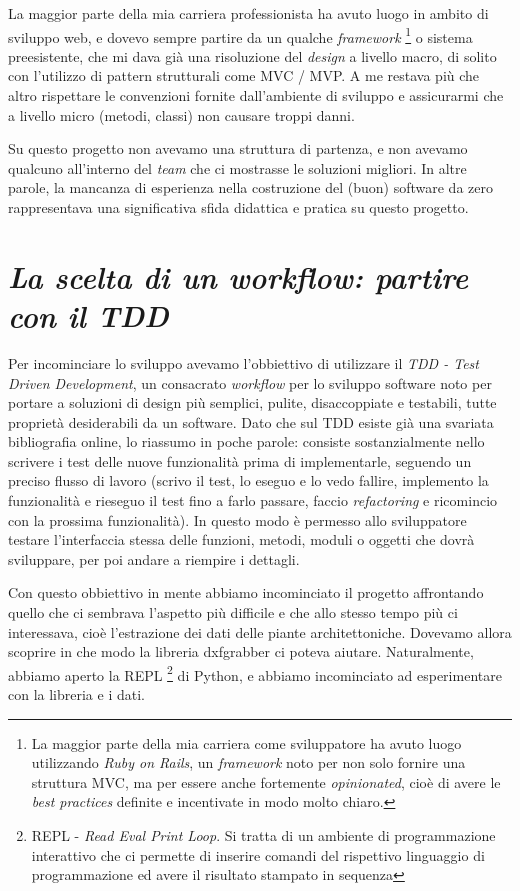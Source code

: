 \documentclass[12pt]{report}
\begin{document}
La maggior parte della mia carriera professionista ha avuto luogo in ambito di sviluppo web, e dovevo sempre partire da un qualche \textit{framework}
\footnote{La maggior parte della mia carriera come sviluppatore ha avuto luogo utilizzando \textit{Ruby on Rails}, un \textit{framework} noto per non solo fornire una struttura MVC, ma per essere anche fortemente \textit{opinionated}, cioè di avere le \textit{best practices} definite e incentivate in modo molto chiaro.} 
o sistema preesistente, che mi dava già una risoluzione del \textit{design} a livello macro, di solito con l'utilizzo di pattern strutturali come MVC / MVP. A me restava più che altro rispettare le convenzioni fornite dall'ambiente di sviluppo e assicurarmi che a livello micro (metodi, classi) non causare troppi danni.

Su questo progetto non avevamo una struttura di partenza, e non avevamo qualcuno all'interno del \textit{team} che ci mostrasse le soluzioni migliori. In altre parole, la mancanza di esperienza nella costruzione del (buon) software da zero rappresentava una significativa sfida didattica e pratica su questo progetto.

\section{\textit{La scelta di un workflow: partire con il TDD}}

Per incominciare lo sviluppo avevamo l'obbiettivo di utilizzare il \textit{TDD - Test Driven Development}, un consacrato \textit{workflow} per lo sviluppo software noto per portare a soluzioni di design più semplici, pulite, disaccoppiate e testabili, tutte proprietà desiderabili da un software. Dato che sul TDD esiste già una svariata bibliografia online, lo riassumo in poche parole: consiste sostanzialmente nello scrivere i test delle nuove funzionalità prima di implementarle, seguendo un preciso flusso di lavoro (scrivo il test, lo eseguo e lo vedo fallire, implemento la funzionalità e rieseguo il test fino a farlo passare, faccio \textit{refactoring} e ricomincio con la prossima funzionalità). In questo modo è permesso allo sviluppatore testare l'interfaccia stessa delle funzioni, metodi, moduli o oggetti che dovrà sviluppare, per poi andare a riempire i dettagli.

Con questo obbiettivo in mente abbiamo incominciato il progetto affrontando quello che ci sembrava l'aspetto più difficile e che allo stesso tempo più ci interessava, cioè l'estrazione dei dati delle piante architettoniche. Dovevamo allora scoprire in che modo la libreria dxfgrabber ci poteva aiutare. Naturalmente, abbiamo aperto la REPL
\footnote{
  REPL - \textit{Read Eval Print Loop}. Si tratta di un ambiente di programmazione interattivo che ci permette di inserire comandi del rispettivo linguaggio di programmazione ed avere il risultato stampato in sequenza 
} 
di Python, e abbiamo incominciato ad esperimentare con la libreria e i dati.
\end{document}
